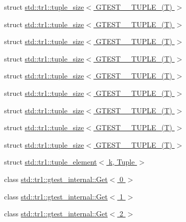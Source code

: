 \begin{DoxyCompactItemize}
struct \hyperlink{structstd_1_1tr1_1_1tuple__size_3_01GTEST__2__TUPLE___07T_08_01_4}{std\+::tr1\+::tuple\+\_\+size$<$ G\+T\+E\+S\+T\+\_\+\_\+\+T\+U\+P\+L\+E\+\_\+(\+T) $>$}
\item 
struct \hyperlink{structstd_1_1tr1_1_1tuple__size_3_01GTEST__3__TUPLE___07T_08_01_4}{std\+::tr1\+::tuple\+\_\+size$<$ G\+T\+E\+S\+T\+\_\+\_\+\+T\+U\+P\+L\+E\+\_\+(\+T) $>$}
\item 
struct \hyperlink{structstd_1_1tr1_1_1tuple__size_3_01GTEST__4__TUPLE___07T_08_01_4}{std\+::tr1\+::tuple\+\_\+size$<$ G\+T\+E\+S\+T\+\_\+\_\+\+T\+U\+P\+L\+E\+\_\+(\+T) $>$}
\item 
struct \hyperlink{structstd_1_1tr1_1_1tuple__size_3_01GTEST__5__TUPLE___07T_08_01_4}{std\+::tr1\+::tuple\+\_\+size$<$ G\+T\+E\+S\+T\+\_\+\_\+\+T\+U\+P\+L\+E\+\_\+(\+T) $>$}
\item 
struct \hyperlink{structstd_1_1tr1_1_1tuple__size_3_01GTEST__6__TUPLE___07T_08_01_4}{std\+::tr1\+::tuple\+\_\+size$<$ G\+T\+E\+S\+T\+\_\+\_\+\+T\+U\+P\+L\+E\+\_\+(\+T) $>$}
\item 
struct \hyperlink{structstd_1_1tr1_1_1tuple__size_3_01GTEST__7__TUPLE___07T_08_01_4}{std\+::tr1\+::tuple\+\_\+size$<$ G\+T\+E\+S\+T\+\_\+\_\+\+T\+U\+P\+L\+E\+\_\+(\+T) $>$}
\item 
struct \hyperlink{structstd_1_1tr1_1_1tuple__size_3_01GTEST__8__TUPLE___07T_08_01_4}{std\+::tr1\+::tuple\+\_\+size$<$ G\+T\+E\+S\+T\+\_\+\_\+\+T\+U\+P\+L\+E\+\_\+(\+T) $>$}
\item 
struct \hyperlink{structstd_1_1tr1_1_1tuple__size_3_01GTEST__9__TUPLE___07T_08_01_4}{std\+::tr1\+::tuple\+\_\+size$<$ G\+T\+E\+S\+T\+\_\+\_\+\+T\+U\+P\+L\+E\+\_\+(\+T) $>$}
\item 
struct \hyperlink{structstd_1_1tr1_1_1tuple__size_3_01GTEST__10__TUPLE___07T_08_01_4}{std\+::tr1\+::tuple\+\_\+size$<$ G\+T\+E\+S\+T\+\_\+\_\+\+T\+U\+P\+L\+E\+\_\+(\+T) $>$}
\item 
struct \hyperlink{structstd_1_1tr1_1_1tuple__element}{std\+::tr1\+::tuple\+\_\+element$<$ k, Tuple $>$}
\item 
class \hyperlink{classstd_1_1tr1_1_1gtest__internal_1_1Get_3_010_01_4}{std\+::tr1\+::gtest\+\_\+internal\+::\+Get$<$ 0 $>$}
\item 
class \hyperlink{classstd_1_1tr1_1_1gtest__internal_1_1Get_3_011_01_4}{std\+::tr1\+::gtest\+\_\+internal\+::\+Get$<$ 1 $>$}
\item 
class \hyperlink{classstd_1_1tr1_1_1gtest__internal_1_1Get_3_012_01_4}{std\+::tr1\+::gtest\+\_\+internal\+::\+Get$<$ 2 $>$}

\end{DoxyCompactItemize}
